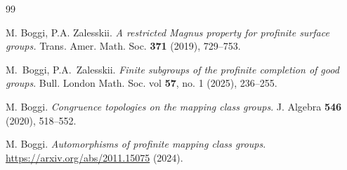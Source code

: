 \documentclass[12pt,twoside]{amsart}
\theoremstyle{definition}
\newcommand{\Q}{\mathbb{Q}}
\def\ol{\overline}
\begin{document}
\begin{thebibliography}{99}

 M. Boggi, P.A. Zalesskii. \textsl{A restricted Magnus property for profinite surface groups.}
Trans. Amer. Math. Soc. {\bf 371} (2019), 729--753.

 M.~Boggi, P.A.~Zalesskii. \textsl{Finite subgroups of the profinite completion of good groups}. 
Bull. London Math. Soc. vol {\bf 57}, no. 1 (2025), 236--255.

M. Boggi. \textsl{Congruence topologies on the mapping class groups}. J. Algebra {\bf 546} (2020), 518--552. 



M. Boggi. \textsl{Automorphisms of profinite mapping class groups}. \url{https://arxiv.org/abs/2011.15075} (2024).








\end{thebibliography}
\end{document}
